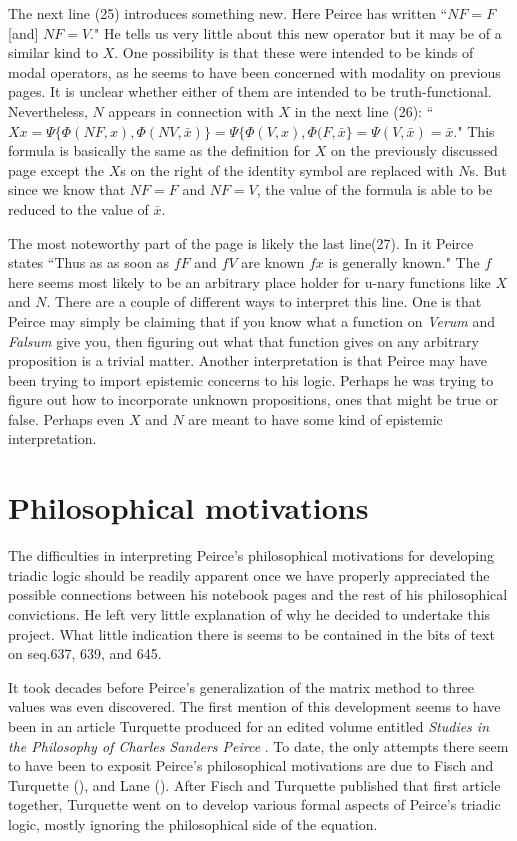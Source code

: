 \documentclass[12pt]{article}
\begin{document}
The next line (25) introduces something new. Here Peirce has written ``$NF=F$ [and] $NF=V$." He tells us very little about this new operator but it may be of a similar kind to $X$. One possibility is that these were intended to be kinds of modal operators, as he seems to have been concerned with modality on previous pages. It is unclear whether either of them are intended to be truth-functional. Nevertheless, $N$ appears in connection with $X$ in the next line (26): ``$Xx=\Psi\{\Phi(NF, x), \Phi(NV, \bar{x})\}=\Psi\{\Phi(V,x),\Phi(F,\bar{x}\}=\Psi(V,\bar{x})=\bar{x} $." This formula is basically the same as the definition for $X$ on the previously discussed page except the $X$s on the right of the identity symbol are replaced with $N$s. But since we know that $NF=F$ and $NF=V$, the value of the formula is able to be reduced to the value of $\bar{x}$. 

The most noteworthy part of the page is likely the last line(27). In it Peirce states ``Thus as as soon as $fF$ and $fV$ are known $fx$ is generally known." The $f$ here seems most likely to be an arbitrary place holder for u-nary functions like $X$ and $N$. There are a couple of different ways to interpret this line. One is that Peirce may simply be claiming that if you know what a function on \textit{Verum} and \textit{Falsum} give you, then figuring out what that function gives on any arbitrary proposition is a trivial matter. Another interpretation is that Peirce may have been trying to import epistemic concerns to his logic. Perhaps he was trying to figure out how to incorporate unknown propositions, ones that might be true or false. Perhaps even $X$ and $N$ are meant to have some kind of epistemic interpretation.

\section{Philosophical motivations}

The difficulties in interpreting Peirce's philosophical motivations for developing triadic logic should be readily apparent once we have properly appreciated the possible connections between his notebook pages and the rest of his philosophical convictions. He left very little explanation of why he decided to undertake this project. What little indication there is seems to be contained in the bits of text on seq.637, 639, and 645.

It took decades before Peirce's generalization of the matrix method to three values was even discovered. The first mention of this development seems to have been in an article Turquette produced for an edited volume entitled \textit{Studies in the Philosophy of Charles Sanders Peirce} \citep{lenzen1964studies}. To date, the only attempts there seem to have been to exposit Peirce's philosophical motivations are due to Fisch and Turquette (\citeyear{fisch1966peirce}), and Lane (\citeyear{lane1999peirce}). After Fisch and Turquette published that first article together, Turquette went on to develop various formal aspects of Peirce's triadic logic, mostly ignoring the philosophical side of the equation.
\end{document}
